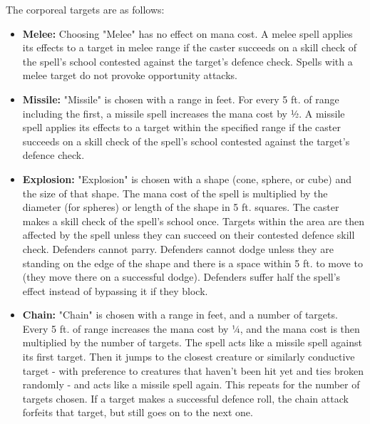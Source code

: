 The corporeal targets are as follows:
\begin{itemize}
    \item \textbf{Melee:} Choosing "Melee" has no effect on mana cost. A
        melee spell applies its effects to a target in melee range if the
        caster succeeds on a skill check of the spell's school contested against
        the target's defence check. Spells with a melee target do not provoke
        opportunity attacks.
    \item \textbf{Missile:} "Missile" is chosen with a range in feet. For every
        5 ft. of range including the first, a missile spell increases
        the mana cost by ½. A missile spell applies its effects to a
        target within the specified range if the caster succeeds on a
        skill check of the spell's school contested against the
        target's defence check.
    \item \textbf{Explosion:} "Explosion" is chosen with a shape (cone, sphere, or
        cube) and the size of that shape. The mana cost of the spell is multiplied
        by the diameter (for spheres) or length of the shape in 5 ft. squares.
        The caster makes a skill check of the spell's school once. Targets
        within the area are then affected by the spell unless they can succeed
        on their contested defence skill check. Defenders cannot parry.
        Defenders cannot dodge unless they are standing on the edge of the
        shape and there is a space within 5 ft. to move to (they move there on
        a successful dodge). Defenders suffer half the spell's effect instead
        of bypassing it if they block.
    \item \textbf{Chain:} "Chain" is chosen with a range in feet, and a number
        of targets. Every 5 ft. of range increases the mana cost by ¼, and the
        mana cost is then multiplied by the number of targets. The spell acts
        like a missile spell against its first target. Then it jumps to the
        closest creature or similarly conductive target - with preference
        to creatures that haven't been hit yet and ties broken
        randomly - and acts like a missile spell again. This repeats for the
        number of targets chosen. If a target makes a successful
        defence roll, the chain attack forfeits that target, but still
        goes on to the next one. 
\end{itemize}

